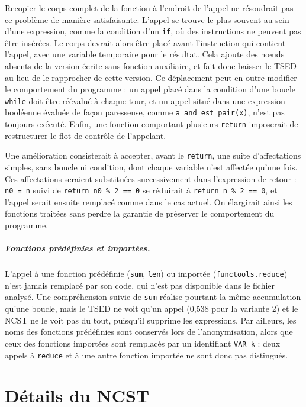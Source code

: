 \documentclass[12pt,a4paper,oneside]{report}
\begin{document}
Recopier le corps complet de la fonction à l'endroit de l'appel ne
résoudrait pas ce problème de manière satisfaisante. L'appel se trouve le
plus souvent au sein d'une expression, comme la condition d'un \texttt{if},
où des instructions ne peuvent pas être insérées. Le corps devrait alors
être placé avant l'instruction qui contient l'appel, avec une variable
temporaire pour le résultat. Cela ajoute des nœuds absents de la version
écrite sans fonction auxiliaire, et fait donc baisser le TSED au lieu de le
rapprocher de cette version. Ce déplacement peut en outre modifier le
comportement du programme : un appel placé dans la condition d'une boucle
\texttt{while} doit être réévalué à chaque tour, et un appel situé dans une
expression booléenne évaluée de façon paresseuse, comme
\texttt{a and est\_pair(x)}, n'est pas toujours exécuté. Enfin, une
fonction comportant plusieurs \texttt{return} imposerait de restructurer le
flot de contrôle de l'appelant.

Une amélioration consisterait à accepter, avant le \texttt{return}, une
suite d'affectations simples, sans boucle ni condition, dont chaque
variable n'est affectée qu'une fois. Ces affectations seraient substituées
successivement dans l'expression de retour : \texttt{n0 = n} suivi de
\texttt{return n0 \% 2 == 0} se réduirait à \texttt{return n \% 2 == 0}, et
l'appel serait ensuite remplacé comme dans le cas actuel. On élargirait
ainsi les fonctions traitées sans perdre la garantie de préserver le
comportement du programme.

\paragraph{Fonctions prédéfinies et importées.}
L'appel à une fonction prédéfinie (\texttt{sum}, \texttt{len}) ou importée
(\texttt{functools.reduce}) n'est jamais remplacé par son code, qui n'est pas
disponible dans le fichier analysé. Une compréhension suivie de
\texttt{sum} réalise pourtant la même accumulation qu'une boucle, mais le
TSED ne voit qu'un appel (0,538 pour la variante 2) et le NCST ne le voit pas
du tout, puisqu'il supprime les expressions. Par ailleurs, les noms des
fonctions prédéfinies sont conservés lors de l'anonymisation, alors que ceux
des fonctions importées sont remplacés par un identifiant \texttt{VAR\_k} :
deux appels à \texttt{reduce} et à une autre fonction importée ne sont donc
pas distingués.

\chapter{Détails du NCST}
\label{chap:ncst}
\end{document}
